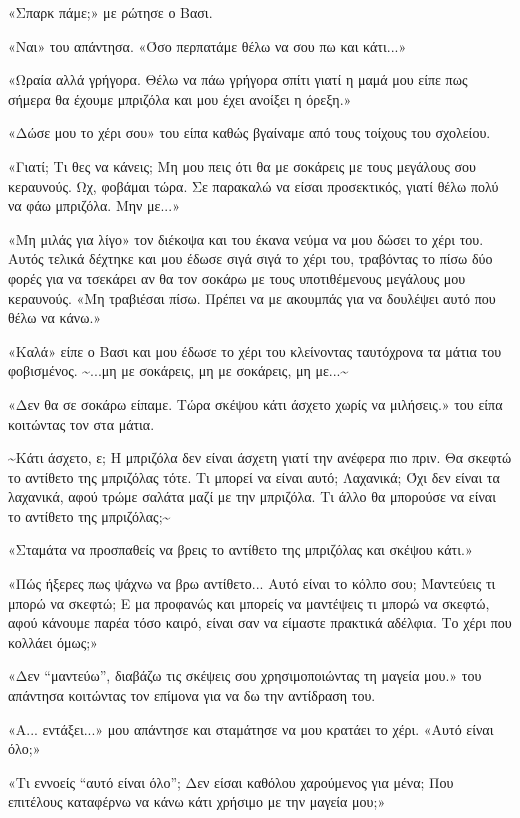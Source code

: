 \documentclass[12pt,twoside, openany]{book}
\begin{document}
«Σπαρκ πάμε;» με ρώτησε ο Βασι.

«Ναι» του απάντησα. «Όσο περπατάμε θέλω να σου πω και κάτι...»

«Ωραία αλλά γρήγορα. Θέλω να πάω γρήγορα σπίτι γιατί η μαμά μου είπε πως σήμερα θα έχουμε μπριζόλα και μου έχει ανοίξει η όρεξη.»

«Δώσε μου το χέρι σου» του είπα καθώς βγαίναμε από τους τοίχους του σχολείου.

«Γιατί; Τι θες να κάνεις; Μη μου πεις ότι θα με σοκάρεις με τους μεγάλους σου κεραυνούς. Ωχ, φοβάμαι τώρα. Σε παρακαλώ να είσαι προσεκτικός, γιατί θέλω πολύ να φάω μπριζόλα. Μην με...»

«Μη μιλάς για λίγο» τον διέκοψα και του έκανα νεύμα να μου δώσει το χέρι του. Αυτός τελικά δέχτηκε και μου έδωσε σιγά σιγά το χέρι του, τραβόντας το πίσω δύο φορές για να τσεκάρει αν θα τον σοκάρω με τους υποτιθέμενους μεγάλους μου κεραυνούς. «Μη τραβιέσαι πίσω. Πρέπει να με ακουμπάς για να δουλέψει αυτό που θέλω να κάνω.»

«Καλά» είπε ο Βασι και μου έδωσε το χέρι του κλείνοντας ταυτόχρονα τα μάτια του φοβισμένος. \textasciitilde ...μη με σοκάρεις, μη με σοκάρεις, μη με...\textasciitilde 

«Δεν θα σε σοκάρω είπαμε. Τώρα σκέψου κάτι άσχετο χωρίς να μιλήσεις.» του είπα κοιτώντας τον στα μάτια.

\textasciitilde Κάτι άσχετο, ε; Η μπριζόλα δεν είναι άσχετη γιατί την ανέφερα πιο πριν. Θα σκεφτώ το αντίθετο της μπριζόλας τότε. Τι μπορεί να είναι αυτό; Λαχανικά; Όχι δεν είναι τα λαχανικά, αφού τρώμε σαλάτα μαζί με την μπριζόλα. Τι άλλο θα μπορούσε να είναι το αντίθετο της μπριζόλας;\textasciitilde 

«Σταμάτα να προσπαθείς να βρεις το αντίθετο της μπριζόλας και σκέψου κάτι.»

«Πώς ήξερες πως ψάχνω να βρω αντίθετο... Αυτό είναι το κόλπο σου; Μαντεύεις τι μπορώ να σκεφτώ; Ε μα προφανώς και μπορείς να μαντέψεις τι μπορώ να σκεφτώ, αφού κάνουμε παρέα τόσο καιρό, είναι σαν να είμαστε πρακτικά αδέλφια. Το χέρι που κολλάει όμως;»

«Δεν “μαντεύω”, διαβάζω τις σκέψεις σου χρησιμοποιώντας τη μαγεία μου.» του απάντησα κοιτώντας τον επίμονα για να δω την αντίδραση του.

«Α... εντάξει...» μου απάντησε και σταμάτησε να μου κρατάει το χέρι. «Αυτό είναι όλο;»

«Τι εννοείς “αυτό είναι όλο”; Δεν είσαι καθόλου χαρούμενος για μένα; Που επιτέλους καταφέρνω να κάνω κάτι χρήσιμο με την μαγεία μου;»
\end{document}
